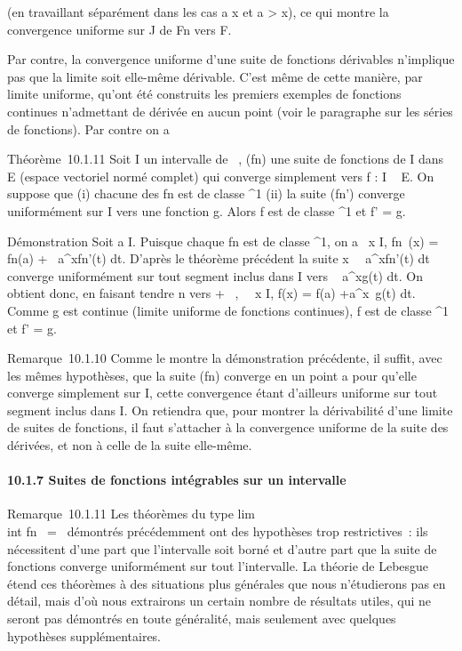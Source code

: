 (en travaillant séparément dans les cas a \leq x et a \textgreater{} x), ce
qui montre la convergence uniforme sur J de Fn vers F.

Par contre, la convergence uniforme d'une suite de fonctions dérivables
n'implique pas que la limite soit elle-même dérivable. C'est même de
cette manière, par limite uniforme, qu'ont été construits les premiers
exemples de fonctions continues n'admettant de dérivée en aucun point
(voir le paragraphe sur les séries de fonctions). Par contre on a

Théorème~10.1.11 Soit I un intervalle de ~, (fn) une suite de
fonctions de I dans E (espace vectoriel normé complet) qui converge
simplement vers f : I \rightarrow~ E. On suppose que (i) chacune des fn
est de classe ^1 (ii) la suite (fn') converge
uniformément sur I vers une fonction g. Alors f est de classe
^1 et f' = g.

Démonstration Soit a \in I. Puisque chaque fn est de classe
^1, on a \forall~x \in I, fn~(x) =
fn(a) +\int ~
a^xfn'(t) dt. D'après le théorème précédent la
suite x\mapsto~\int ~
a^xfn'(t) dt converge uniformément sur tout
segment inclus dans I vers \int ~
a^xg(t) dt. On obtient donc, en faisant tendre n vers +
\infty~, \forall~~x \in I, f(x) = f(a)
+\int  a^x~g(t) dt. Comme g est
continue (limite uniforme de fonctions continues), f est de classe
^1 et f' = g.

Remarque~10.1.10 Comme le montre la démonstration précédente, il suffit,
avec les mêmes hypothèses, que la suite (fn) converge en un
point a pour qu'elle converge simplement sur I, cette convergence étant
d'ailleurs uniforme sur tout segment inclus dans I. On retiendra que,
pour montrer la dérivabilité d'une limite de suites de fonctions, il
faut s'attacher à la convergence uniforme de la suite des dérivées, et
non à celle de la suite elle-même.

\paragraph{10.1.7 Suites de fonctions intégrables sur un intervalle}

Remarque~10.1.11 Les théorèmes du type
lim\\int  fn~
=\int  \limfn~
démontrés précédemment ont des hypothèses trop restrictives~: ils
nécessitent d'une part que l'intervalle soit borné et d'autre part que
la suite de fonctions converge uniformément sur tout l'intervalle. La
théorie de Lebesgue étend ces théorèmes à des situations plus générales
que nous n'étudierons pas en détail, mais d'où nous extrairons un
certain nombre de résultats utiles, qui ne seront pas démontrés en toute
généralité, mais seulement avec quelques hypothèses supplémentaires.

